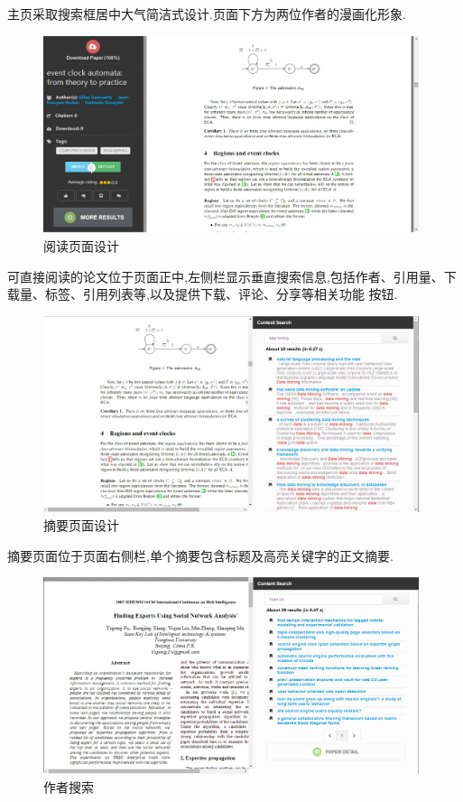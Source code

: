 主页采取搜索框居中大气简洁式设计.页面下方为两位作者的漫画化形象.

\begin{figure}[H]
  \small
  \centering
  \includegraphics[width=11cm]{img/reading.png}
  \caption{阅读页面设计}
\end{figure}
可直接阅读的论文位于页面正中,左侧栏显示垂直搜索信息,包括作者、引用量、下载量、标签、引用列表等,以及提供下载、评论、分享等相关功能 按钮.

\begin{figure}[H]
  \small
  \centering
  \includegraphics[width=11cm]{img/summary.png}
  \caption{摘要页面设计}
\end{figure}

摘要页面位于页面右侧栏,单个摘要包含标题及高亮关键字的正文摘要.

\begin{figure}[H]
  \small
  \centering
  \includegraphics[width=11cm]{img/author.png}
  \caption{作者搜索}
\end{figure}


